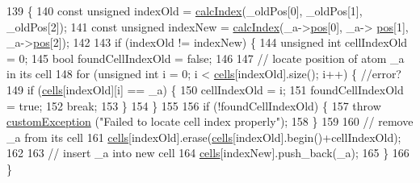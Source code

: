 \begin{DoxyCode}
139                                                                         \{
140                 \textcolor{keyword}{const} \textcolor{keywordtype}{unsigned} indexOld = \hyperlink{classcell_list_aa6b843131cd487164a137571c7343cab}{calcIndex}(\_oldPos[0], \_oldPos[1], \_oldPos[2]);
141                 \textcolor{keyword}{const} \textcolor{keywordtype}{unsigned} indexNew = \hyperlink{classcell_list_aa6b843131cd487164a137571c7343cab}{calcIndex}(\_a->\hyperlink{classatom_a3ae5f4880e7831d8b2c9fda72b4eb24a}{pos}[0], \_a->
      \hyperlink{classatom_a3ae5f4880e7831d8b2c9fda72b4eb24a}{pos}[1], \_a->\hyperlink{classatom_a3ae5f4880e7831d8b2c9fda72b4eb24a}{pos}[2]);
142                 
143                 \textcolor{keywordflow}{if} (indexOld != indexNew) \{
144                                 \textcolor{keywordtype}{unsigned} \textcolor{keywordtype}{int} cellIndexOld = 0;
145                                 \textcolor{keywordtype}{bool} foundCellIndexOld = \textcolor{keyword}{false};
146                 
147                                 \textcolor{comment}{// locate position of atom \_a in its cell}
148                                 \textcolor{keywordflow}{for} (\textcolor{keywordtype}{unsigned} \textcolor{keywordtype}{int} i = 0; i < \hyperlink{classcell_list_a10bc0c3ae819293b1e88bc7d1bfdb2aa}{cells}[indexOld].size(); i++) \{ \textcolor{comment}{//error?}
149                                                 \textcolor{keywordflow}{if} (\hyperlink{classcell_list_a10bc0c3ae819293b1e88bc7d1bfdb2aa}{cells}[indexOld][i] == \_a) \{
150                                                                 cellIndexOld = i;
151                                                                 foundCellIndexOld = \textcolor{keyword}{true};
152                                                                 \textcolor{keywordflow}{break};
153                                                 \}
154                                 \}
155                                 
156                                 \textcolor{keywordflow}{if} (!foundCellIndexOld) \{
157                                                 \textcolor{keywordflow}{throw} \hyperlink{classcustom_exception}{customException} (\textcolor{stringliteral}{"Failed to locate
       cell index properly"});
158                                 \}
159                                 
160                                 \textcolor{comment}{// remove \_a from its cell}
161                                 \hyperlink{classcell_list_a10bc0c3ae819293b1e88bc7d1bfdb2aa}{cells}[indexOld].erase(\hyperlink{classcell_list_a10bc0c3ae819293b1e88bc7d1bfdb2aa}{cells}[indexOld].begin()+cellIndexOld);
162                                 
163                                 \textcolor{comment}{// insert \_a into new cell}
164                                 \hyperlink{classcell_list_a10bc0c3ae819293b1e88bc7d1bfdb2aa}{cells}[indexNew].push\_back(\_a);
165                 \}
166 \}\end{DoxyCode}


